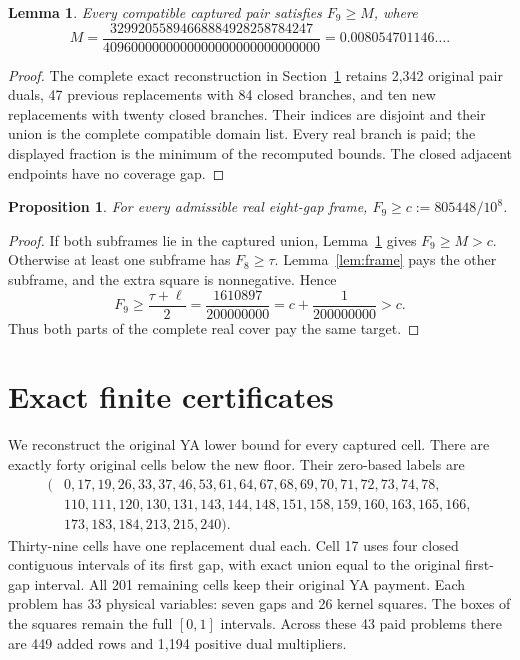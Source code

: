 \documentclass[11pt,a4paper]{article}
\newtheorem{lemma}[theorem]{Lemma}
\newtheorem{proposition}[theorem]{Proposition}
\begin{document}
\begin{lemma}\label{lem:pair}
Every compatible captured pair satisfies $F_9\ge M$, where
\[
 M=\frac{32992055894668884928258784247}
         {4096000000000000000000000000000}
   =0.008054701146\ldots.
\]
\end{lemma}
\begin{proof}
The complete exact reconstruction in Section~\ref{sec:finite}
retains 2,342 original pair duals, 47 previous replacements with 84
closed branches, and ten new replacements with twenty closed branches.
Their indices are disjoint and their union is the complete compatible
domain list. Every real branch is paid; the displayed fraction is the
minimum of the recomputed bounds. The closed adjacent endpoints have
no coverage gap.
\end{proof}

\begin{proposition}\label{prop:local}
For every admissible real eight-gap frame,
$F_9\ge c:=805448/10^8$.
\end{proposition}
\begin{proof}
If both subframes lie in the captured union, Lemma~\ref{lem:pair}
gives $F_9\ge M>c$. Otherwise at least one subframe has $F_8\ge\tau$.
Lemma~\ref{lem:frame} pays the other subframe, and the extra square is
nonnegative. Hence
\[
 F_9\ge\frac{\tau+\ell}{2}
       =\frac{1610897}{200000000}
       =c+\frac1{200000000}>c.
\]
Thus both parts of the complete real cover pay the same target.
\end{proof}

\section{Exact finite certificates}\label{sec:finite}

We reconstruct the original YA lower bound for every captured cell.
There are exactly forty original cells below the new floor. Their
zero-based labels are
\[
\begin{split}
(&0,17,19,26,33,37,46,53,61,64,67,68,69,70,71,72,73,74,78,\\
 &110,111,120,130,131,143,144,148,151,158,159,160,163,165,166,\\
 &173,183,184,213,215,240).
\end{split}
\]
Thirty-nine cells have one replacement dual each. Cell 17 uses four
closed contiguous intervals of its first gap, with exact union equal
to the original first-gap interval. All 201 remaining cells keep
their original YA payment. Each problem has 33 physical variables:
seven gaps and 26 kernel squares. The boxes of the squares remain
the full $[0,1]$ intervals. Across these 43 paid problems there are
449 added rows and 1,194 positive dual multipliers.
\end{document}
